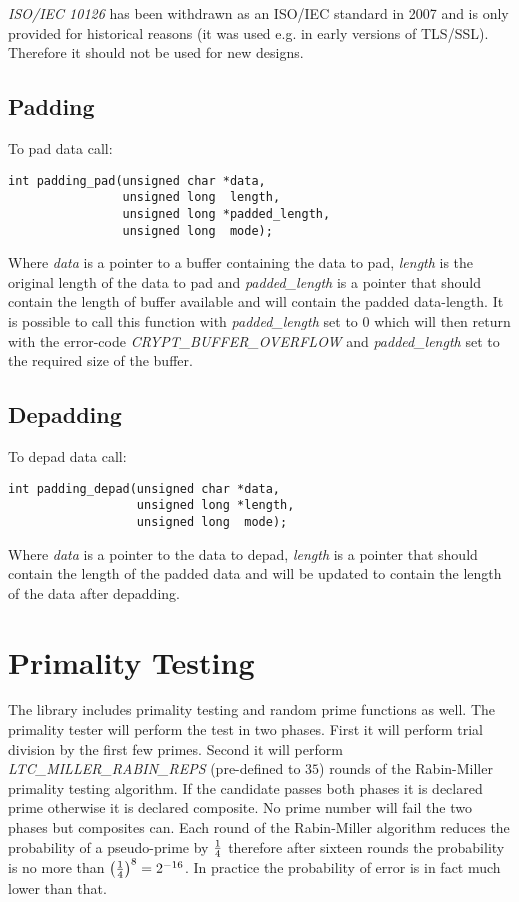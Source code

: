 \documentclass[synpaper]{book}
\newcommand{\mysection}[1]    %
	{                   %
	\section{#1}
   \markboth{\textsf{www.libtom.net}}{\thesection ~ {#1}}
	}
\begin{document}
\textit{ISO/IEC 10126} has been withdrawn as an ISO/IEC standard in 2007 and is only provided for historical reasons (it was used e.g. in early versions of TLS/SSL).
Therefore it should not be used for new designs.


\subsection{Padding}

To pad data call:

\begin{verbatim}
int padding_pad(unsigned char *data,
                unsigned long  length,
                unsigned long *padded_length,
                unsigned long  mode);
\end{verbatim}

Where \textit{data} is a pointer to a buffer containing the data to pad,
\textit{length} is the original length of the data to pad and
\textit{padded\_length} is a pointer that should contain the length of buffer available and will contain the padded data-length.
It is possible to call this function with \textit{padded\_length} set to $0$ which will then return with the error-code \textit{CRYPT\_BUFFER\_OVERFLOW}
and \textit{padded\_length} set to the required size of the buffer.


\subsection{Depadding}

To depad data call:

\begin{verbatim}
int padding_depad(unsigned char *data,
                  unsigned long *length,
                  unsigned long  mode);
\end{verbatim}

Where \textit{data} is a pointer to the data to depad,
\textit{length} is a pointer that should contain the length of the padded data and will be updated to contain the length of the data after depadding.


\mysection{Primality Testing}
The library includes primality testing and random prime functions as well.  The primality tester will perform the test in
two phases.  First it will perform trial division by the first few primes.  Second it will perform \textit{LTC\_MILLER\_RABIN\_REPS} (pre-defined to $35$) rounds of the
Rabin-Miller primality testing algorithm.  If the candidate passes both phases it is declared prime otherwise it is declared
composite.  No prime number will fail the two phases but composites can.  Each round of the Rabin-Miller algorithm reduces
the probability of a pseudo-prime by $1 \over 4$ therefore after sixteen rounds the probability is no more than
$\left ( { 1 \over 4 } \right )^{8} = 2^{-16}$.  In practice the probability of error is in fact much lower than that.
\end{document}
